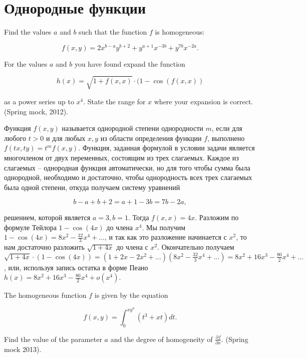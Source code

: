 

\section{Однородные функции}

\begin{problem}
Find the values $a$ and $b$ such that the function $f$ is homogeneous:

\[f(x,y)=2x^{b-a} y^{b+2} +y^{a+1} x^{-3b} +y^{7b} x^{-2a} .\] 

For the values $a$ and $b$ you have found expand the function

\[h(x)=\sqrt{1+f(x,x)} \cdot (1-\cos (f(x,x))\] 

as a power series up to $x^{4} $. State the range for $x$ where your expansion is correct. (Spring mock, 2012).
\end{problem}


\begin{solution}
Функция $f(x,y)$ называется однородной степени однородности $m$, если для любого $t>0$ и для любых $x,y$ из области определения функции $f$, выполнено $f(tx,ty)=t^{m} f(x,y)$. Функция, заданная формулой в условии задачи является многочленом от двух переменных, состоящим из трех слагаемых. Каждое из слагаемых -- однородная функция автоматически, но для того чтобы сумма была однородной, необходимо и достаточно, чтобы однородность всех трех слагаемых была одной степени, откуда получаем систему уравнений 

\[b-a+b+2=a+1-3b=7b-2a,\] 

решением, которой является $a=3,  b=1$. Тогда $f(x,x)=4x$. Разложим по формуле Тейлора $1-\cos (4x)$ до члена $x^{4} $. Мы получим $1-\cos (4x)=8x^{2} -\frac{32}{3} x^{4} +\ldots $, и так как это разложение начинается с $x^{2} $, то нам достаточно разложить $\sqrt{1+4x} $ до члена с $x^{2} $. Окончательно получаем $\sqrt{1+4x} \cdot (1-\cos (4x))=(1+2x-2x^{2} +\ldots )(8x^{2} -\frac{32}{3} x^{4} + \ldots )=8x^{2} +16x^{3} -\frac{80}{2} x^{4} +\ldots $, или, используя запись остатка в форме Пеано $h(x)=8x^{2} +16x^{3} -\frac{80}{2} x^{4} +o(x^{4} )$.
\end{solution}


\begin{problem}
The homogeneous function $f$ is given by the equation

\[f(x,y)=\int _{0}^{xy^{a} }(t^{3} +xt)dt .\] 


Find the value of the parameter $a$ and the degree of homogeneity of $\frac{\partial f}{\partial x} $. (Spring mock 2013).
\end{problem}


